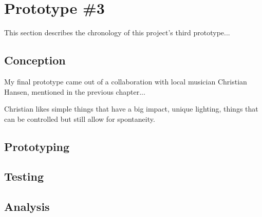 \chapter{Prototype \#3}

This section describes the chronology of this project's third prototype...

\section{Conception}

My final prototype came out of a collaboration with local musician Christian Hansen, mentioned in the previous chapter...

Christian likes simple things that have a big impact, unique lighting, things that can be controlled but still allow for spontaneity.


\section{Prototyping}



\section{Testing}


\section{Analysis}
